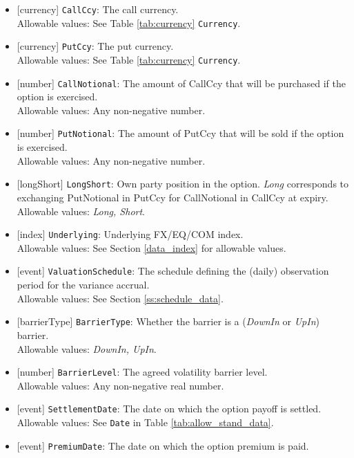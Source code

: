 \begin{itemize}
  \item{}[currency] \lstinline!CallCcy!: The call currency. \\
  Allowable values: See Table \ref{tab:currency} \lstinline!Currency!.
  \item{}[currency] \lstinline!PutCcy!: The put currency. \\
  Allowable values: See Table \ref{tab:currency} \lstinline!Currency!.
  \item{}[number] \lstinline!CallNotional!: The amount of CallCcy that will be purchased if the option is exercised. \\
  Allowable values: Any non-negative number.
    \item{}[number] \lstinline!PutNotional!: The amount of PutCcy that will be sold if the option is exercised. \\
  Allowable values: Any non-negative number.
  \item{}[longShort] \lstinline!LongShort!: Own party position in the option. \emph{Long} corresponds to exchanging PutNotional in PutCcy for CallNotional in CallCcy at expiry. \\
  Allowable values: \emph{Long, Short}.
  \item{}[index] \lstinline!Underlying!: Underlying FX/EQ/COM index. \\
  Allowable values: See Section \ref{data_index} for allowable values.
  \item{}[event] \lstinline!ValuationSchedule!: The schedule defining the (daily) observation period for the variance accrual. \\
  Allowable values: See Section \ref{ss:schedule_data}.
  \item{}[barrierType] \lstinline!BarrierType!: Whether the barrier is a (\emph{DownIn} or \emph{UpIn}) barrier. \\
  Allowable values: \emph{DownIn, UpIn}.
  \item{}[number] \lstinline!BarrierLevel!: The agreed volatility barrier level. \\
  Allowable values: Any non-negative real number.
  \item{}[event] \lstinline!SettlementDate!: The date on which the option payoff is settled. \\
  Allowable values: See \lstinline!Date! in Table \ref{tab:allow_stand_data}.
  \item{}[event] \lstinline!PremiumDate!: The date on which the option premium is paid. \\

\end{itemize}
